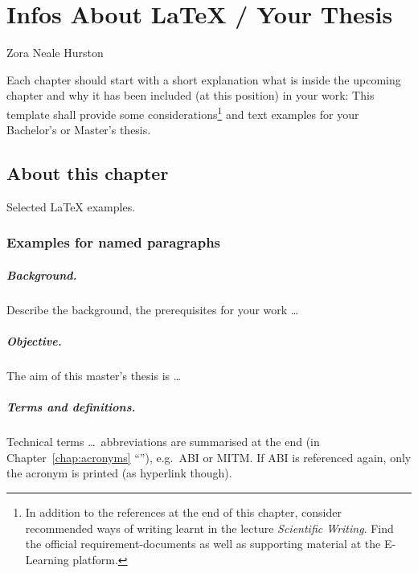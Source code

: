 \chapter{Infos About \LaTeX{} / Your Thesis}\label{chap:info_REMOVE_ME}
\chapterstart

          {Zora Neale Hurston}
          
Each chapter should start with a short explanation what is inside the upcoming chapter and why it has been included (at this position) in your work: This template shall provide some considerations\footnote{
In addition to the references at the end of this chapter, consider recommended ways of writing learnt in the lecture \emph{Scientific Writing}. Find the official requirement-documents as well as supporting material at the E-Learning platform.
} 
and text examples for your Bachelor's or Master's thesis.


\section{About this chapter}
Selected \LaTeX{} examples.

\subsection{Examples for named paragraphs}

\paragraph{Background.}
Describe the background, the prerequisites for your work \ldots

\paragraph{Objective.}
The aim of this master's thesis is \ldots

\paragraph{Terms and definitions.}
Technical terms \ldots\ abbreviations are summarised at the end (in Chapter~\ref{chap:acronyms} ``''), e.g.\ \ac{ABI} or \ac{MITM}. If \ac{ABI} is referenced again, only the acronym is printed (as hyperlink though).

